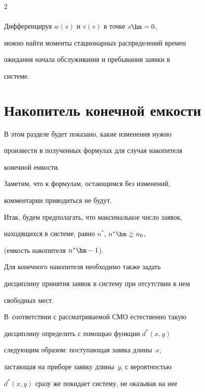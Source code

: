 \begin{multicols}{2}
\begin{multline*}
\end{multline*}





Дифференцируя $w(s)$ и $v(s)$ в точке $s\hm=0$,


можно найти моменты стационарных распределений времен


ожидания начала обслуживания и пребывания заявки в


сис\-теме.





\section{Накопитель конечной емкости}





В этом разделе будет показано, какие изменения нужно


произвести в полученных формулах для случая накопителя


конечной емкости.


Заметим, что к формулам, остающимся без изменений,


комментарии приводиться не будут.








Итак, будем предполагать, что максимальное число заявок,


находящихся в системе, равно $n^*$, $n^*\hm\ge n_0$,


(емкость накопителя $n^*\hm-1$).





Для конечного накопителя необходимо также задать


дисциплину принятия заявок в систему при отсутствии в нем


свободных мест.


В~соответствии с рассматриваемой СМО естественно такую


дисциплину определить с помощью функции $d^*(x,y)$


следующим образом: поступающая заявка длины~$x$,\linebreak


застающая на приборе заявку длины~$y$, с ве\-ро\-ят\-ностью


$d^*(x,y)$ сразу же покидает сис\-те\-му, не оказывая на нее



\end{multicols}

